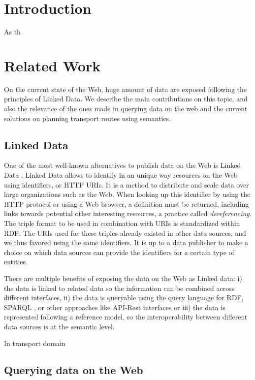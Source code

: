 \section{Introduction}\label{introduction} %
As th



\section{Related Work}\label{related_work} %
On the current state of the Web, huge amount of data are exposed following the principles of Linked Data. We describe the main contributions on this topic, and also the relevance of the ones made in querying data on the web and the current solutions on planning transport routes using semantics.
\subsection{Linked Data}
One of the most well-known alternatives to publish data on the Web is Linked Data \cite{bizer2009linked}. Linked Data allows to identify in an unique way resources on the Web using identifiers, or HTTP URIs. It is a method to distribute and scale data over large organizations such as the Web. When looking up this identifier by using the HTTP protocol or using a Web browser, a definition must be returned, including links towards potential other interesting resources, a practice called \textit{dereferencing}. The triple format to be used in combination with URIs is standardized within RDF. The URIs used for these triples already existed in other data sources, and we thus favored using the same identifiers. It is up to a data publisher to make a choice on which data sources can provide the identifiers for a certain type of entities. 

There are multiple benefits of exposing the data on the Web as Linked data: i) the data is linked to related data so the information can be combined across different interfaces, ii) the data is queryable using the query language for RDF, SPARQL \cite{prud2006sparql}, or other approaches like API-Rest interfaces \cite{world2014json} or \cite{lanthaler2013creating} iii) the data is represented following a reference model, so the interoperability between different data sources is at the semantic level.

In transport domain


\subsection{Querying data on the Web}

